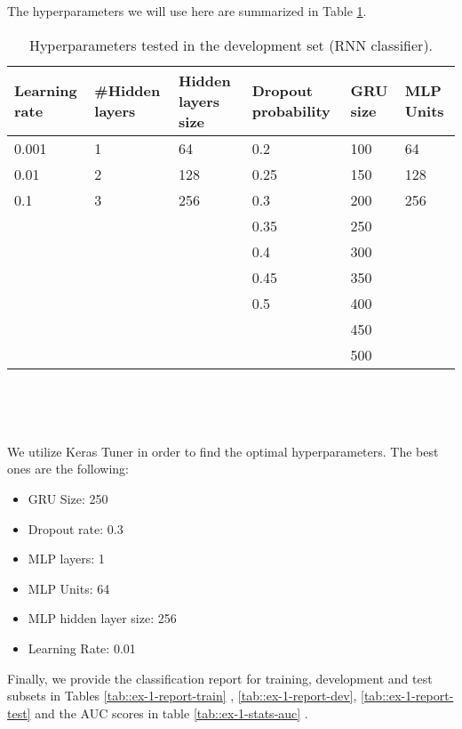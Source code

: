 \documentclass[10pt, a4paper]{article}
\begin{document}
	The hyperparameters we will use here are summarized in Table \ref{tab::ex-1-hyper}.
	
	\begin{table}
		\centering
		\begin{tabular}{|l|l|l|l|l|l|}
			\hline
			\rowcolor{blue!25}\textbf{Learning rate} & \cellcolor{blue!25}\textbf{\#Hidden layers} & \cellcolor{blue!25}\textbf{Hidden layers size} & \cellcolor{blue!25}\textbf{Dropout probability} & \cellcolor{blue!25}\textbf{GRU size}  & \cellcolor{blue!25}\textbf{MLP Units}\\
			\hline
			0.001 & 1 & 64 & 0.2 & 100 & 64\\
			\hline
			0.01 & 2 & 128 & 0.25 & 150 & 128\\
			\hline
			0.1 & 3 & 256 & 0.3 & 200 & 256 \\
			\hline 
			& & & 0.35 & 250 & \\
			\hline 
			& & & 0.4 & 300 &\\
			\hline 
			& & & 0.45 & 350 &\\
			\hline 
			& & & 0.5 & 400 &\\
			\hline 
			& & &  & 450 &\\
			\hline 
			& & & & 500 & \\
			
			
			
			\hline
		\end{tabular}
		\caption{Hyperparameters tested in the development set (RNN classifier).}
		\label{tab::ex-1-hyper}
	\end{table}
	
	\ 
	
	
	\
	
	We utilize Keras Tuner in order to find the optimal hyperparameters. The best ones are the following:
	\begin{itemize}
		\item GRU Size: 250
		\item Dropout rate: 0.3
		\item MLP layers: 1
		\item MLP Units: 64
		\item MLP hidden layer size: 256
		\item Learning Rate: 0.01
	\end{itemize}
	
	
	
	Finally, we provide the classification report for training, development and test subsets in Tables \ref{tab::ex-1-report-train} , \ref{tab::ex-1-report-dev}, \ref{tab::ex-1-report-test} and the AUC scores in table \ref{tab::ex-1-stats-auc} .
	
\end{document}

